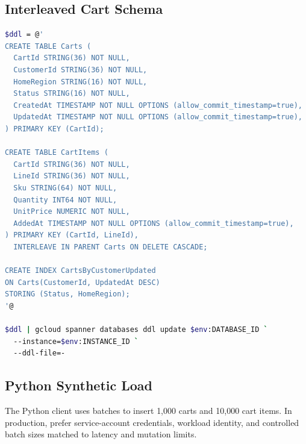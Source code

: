 \subsection{Interleaved Cart Schema}
\begin{lstlisting}[language=bash,caption={Creating an interleaved e-commerce cart schema with DDL.}]
$ddl = @'
CREATE TABLE Carts (
  CartId STRING(36) NOT NULL,
  CustomerId STRING(36) NOT NULL,
  HomeRegion STRING(16) NOT NULL,
  Status STRING(16) NOT NULL,
  CreatedAt TIMESTAMP NOT NULL OPTIONS (allow_commit_timestamp=true),
  UpdatedAt TIMESTAMP NOT NULL OPTIONS (allow_commit_timestamp=true),
) PRIMARY KEY (CartId);

CREATE TABLE CartItems (
  CartId STRING(36) NOT NULL,
  LineId STRING(36) NOT NULL,
  Sku STRING(64) NOT NULL,
  Quantity INT64 NOT NULL,
  UnitPrice NUMERIC NOT NULL,
  AddedAt TIMESTAMP NOT NULL OPTIONS (allow_commit_timestamp=true),
) PRIMARY KEY (CartId, LineId),
  INTERLEAVE IN PARENT Carts ON DELETE CASCADE;

CREATE INDEX CartsByCustomerUpdated
ON Carts(CustomerId, UpdatedAt DESC)
STORING (Status, HomeRegion);
'@

$ddl | gcloud spanner databases ddl update $env:DATABASE_ID `
  --instance=$env:INSTANCE_ID `
  --ddl-file=-
\end{lstlisting}

\subsection{Python Synthetic Load}
The Python client uses batches to insert 1,000 carts and 10,000 cart items. In production, prefer service-account credentials, workload identity, and controlled batch sizes matched to latency and mutation limits.

